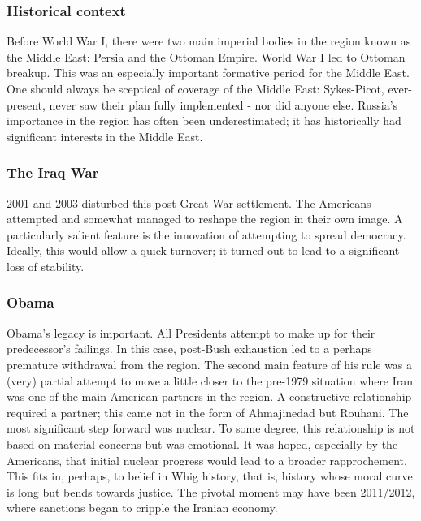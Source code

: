 \documentclass[11pt,a4paper]{report}
\begin{document}
\begin{multicols}{2}

\subsubsection{Historical context}\label{historic-context}

Before World War I, there were two main imperial bodies in the region
known as the Middle East: Persia and the Ottoman Empire. World War I led
to Ottoman breakup. This was an especially important formative period
for the Middle East. One should always be sceptical of coverage of the
Middle East: Sykes-Picot, ever-present, never saw their plan fully
implemented - nor did anyone else. Russia's importance in the region has
often been underestimated; it has historically had significant interests
in the Middle East.

\subsubsection{The Iraq War}\label{the-iraq-war}

2001 and 2003 disturbed this post-Great War settlement. The Americans
attempted and somewhat managed to reshape the region in their own image.
A particularly salient feature is the innovation of attempting to spread
democracy. Ideally, this would allow a quick turnover; it turned out to
lead to a significant loss of stability.

\subsubsection{Obama}\label{obama}

Obama's legacy is important. All Presidents attempt to make up for their
predecessor's failings. In this case, post-Bush exhaustion led to a
perhaps premature withdrawal from the region. The second main feature of
his rule was a (very) partial attempt to move a little closer to the
pre-1979 situation where Iran was one of the main American partners in
the region. A constructive relationship required a partner; this came
not in the form of Ahmajinedad but Rouhani. The most significant step
forward was nuclear. To some degree, this relationship is not based on
material concerns but was emotional. It was hoped, especially by the
Americans, that initial nuclear progress would lead to a broader
rapprochement. This fits in, perhaps, to belief in Whig history, that
is, history whose moral curve is long but bends towards justice. The
pivotal moment may have been 2011/2012, where sanctions began to cripple
the Iranian economy.


\end{multicols}
\end{document}

